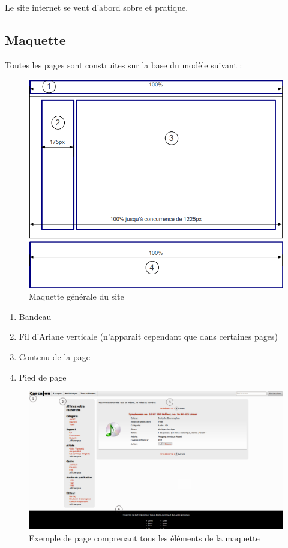 \documentclass[letter, 11pt]{report}
\begin{document}
Le site internet se veut d'abord sobre et pratique.

\subsection{Maquette}

Toutes les pages sont construites sur la base du modèle suivant :

\begin{figure}[htbp]
	\begin{center}
		\includegraphics[scale=0.6]{maquetteImage.png}
	\end{center}
	\caption{Maquette générale du site}
\end{figure}

\begin{enumerate}
	\item Bandeau
	\item Fil d'Ariane verticale (n'apparait cependant que dans certaines pages)
	\item Contenu de la page
	\item Pied de page
\end{enumerate}

\begin{figure}[htbp]
	\begin{center}
		\includegraphics[scale=0.3]{pageType.png}
	\end{center}
	\caption{Exemple de page comprenant tous les éléments de la maquette}
\end{figure}
\end{document}
